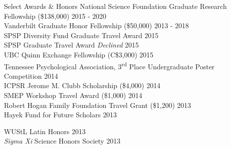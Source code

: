 \begin{rSection}{\textrm{Select Awards \& Honors}}
National Science Foundation Graduate Research Fellowship (\$138,000) \hfill{2015 - 2020}\smallskip\\
Vanderbilt Graduate Honor Fellowship (\$50,000)	\hfill{2013 - 2018}\smallskip\\	
SPSP Diversity Fund Graduate Travel Award %
\hfill{2015}\smallskip\\
SPSP Graduate Travel Award %
{\small \textit{Declined}} \hfill{2015}\smallskip\\
UBC Quinn Exchange Fellowship (C\$3,000) \hfill{2015}\smallskip\\
Tennessee Psychological Association, 3\textsuperscript{rd} Place Undergraduate Poster Competition \hfill{2014}\smallskip\\
ICPSR Jerome M. Clubb Scholarship (\$4,000) \hfill{2014}\smallskip\\
SMEP Workshop Travel Award (\$1,000) \hfill{2014}\smallskip\\
Robert Hogan Family Foundation Travel Grant (\$1,200) 	\hfill  {2013}\smallskip\\
Hayek Fund for Future Scholars                      \hfill  {2013}\smallskip\\
\begin{minipage}{\linewidth}\vspace{1.1mm} WUStL Latin Honors \hfill  {2013}\smallskip\\
\textit{Sigma Xi} Science Honors Society                    			\hfill  {2013}
\end{minipage}%
\end{rSection}


